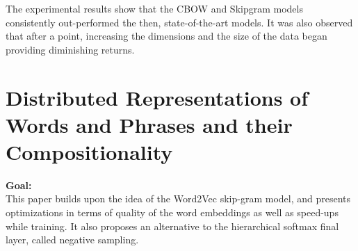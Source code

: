 \documentclass[11pt,a4paper]{article}
\begin{document}
  The experimental results show that the CBOW and Skipgram models consistently out-performed the then, state-of-the-art models. It was also observed that after a point, increasing the dimensions and the size of the data began providing diminishing returns.



\section{Distributed Representations of Words and Phrases and their Compositionality} %
\label{sec:distributed_representations_of_words_and_phrases_and_their_compositionality}

  \textbf{Goal:}\\
  This paper builds upon the idea of the Word2Vec skip-gram model, and presents optimizations in terms of quality of the word embeddings as well as speed-ups while training. It also proposes an alternative to the hierarchical softmax final layer, called negative sampling.\\
\end{document}
